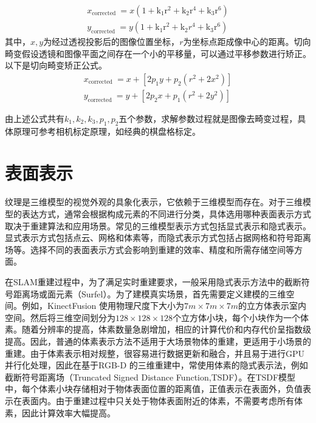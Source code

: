 \begin{equation}
\begin{array}{l}
x_{\text {corrected }}=x\left(1+\mathrm{k}_{1} \mathrm{r}^{2}+\mathrm{k}_{2} \mathrm{r}^{4}+\mathrm{k}_{3} \mathrm{r}^{6}\right) \\
y_{\text {corrected }}=y\left(1+\mathrm{k}_{1} \mathrm{r}^{2}+\mathrm{k}_{2} r^{4}+\mathrm{k}_{3} \mathrm{r}^{6}\right)
\end{array}
\end{equation}
其中，$x,y$为经过透视投影后的图像位置坐标，$r$为坐标点距成像中心的距离。切向畸变假设透镜和图像平面之间存在一个小的平移量，可以通过平移参数进行矫正。以下是切向畸变矫正公式。
\begin{equation}
\begin{array}{l}
x_{\text {corrected }}=x+\left[2 p_{1} y+p_{2}\left(r^{2}+2 x^{2}\right)\right] \\
y_{\text {corrected }}=y+\left[2 p_{2} x+p_{1}\left(r^{2}+2 y^{2}\right)\right]
\end{array}
\end{equation}

由上述公式共有$k_1,k_2,k_3,p_1,p_2$五个参数，求解参数过程就是图像去畸变过程，具体原理可参考相机标定原理，如经典的棋盘格标定。

%
%
\section{表面表示}
纹理是三维模型的视觉外观的具象化表示，它依赖于三维模型而存在。对于三维模型的表达方式，通常会根据构成元素的不同进行分类，具体选用哪种表面表示方式取决于重建算法和应用场景。常见的三维模型表示方式包括显式表示和隐式表示。显式表示方式包括点云、网格和体素等，而隐式表示方式包括占据网格和符号距离场等。选择不同的表面表示方式会影响到重建的效率、精度和所需存储空间等方面。\par

在SLAM重建过程中，为了满足实时重建要求，一般采用隐式表示方法中的截断符号距离场或面元素（Surfel）。为了建模真实场景，首先需要定义建模的三维空间。例如，KinectFusion 使用物理尺度下大小为$7m \times 7m \times 7m$的立方体表示室内空间。然后将三维空间划分为$128 \times 128 \times 128$个立方体小块，每个小块作为一个体素。随着分辨率的提高，体素数量急剧增加，相应的计算代价和内存代价呈指数级提高。因此，普通的体素表示方法不适用于大场景物体的重建，更适用于小场景的重建。由于体素表示相对规整，很容易进行数据更新和融合，并且易于进行GPU并行化处理，因此在基于RGB-D 的三维重建中，常使用体素的隐式表示法，例如截断符号距离场（Truncated Signed Distance Function,TSDF）。在TSDF模型中，每个体素小块存储相对于物体表面位置的距离值，正值表示在表面外，负值表示在表面内。由于重建过程中只关处于物体表面附近的体素，不需要考虑所有体素，因此计算效率大幅提高。\par


